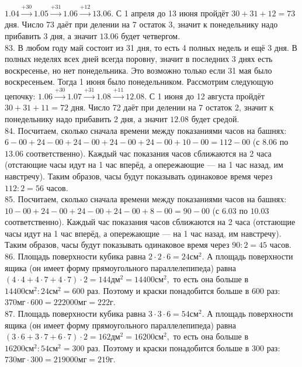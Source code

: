 $1.04\stackrel{+30}{\rightarrow}1.05\stackrel{+31}{\rightarrow}1.06\stackrel{+12}{\rightarrow}13.06.$ С 1 апреля до 13 июня пройдёт $30+31+12=73$ дня. Число 73 даёт при делении на 7 остаток 3, значит к понедельнику надо прибавить 3 дня, а значит $13.06$ будет четвергом.\\
83. В любом году май состоит из 31 дня, то есть 4 полных недель и ещё 3 дня. В полных неделях всех дней всегда поровну, значит в последних 3 днях есть воскресенье, но нет понедельника. Это возможно только если 31 мая было воскресеньем. Тогда 1 июня было понедельником. Рассмотрим следующую цепочку:
$1.06\stackrel{+30}{\rightarrow}1.07\stackrel{+31}{\rightarrow}1.08\stackrel{+11}{\rightarrow}12.08.$ С 1 июня до 12 августа пройдёт $30+31+11=72$ дня. Число 72 даёт при делении на 7 остаток 2, значит к понедельнику надо прибавить 2 дня, а значит $12.08$ будет средой.\\
84. Посчитаем, сколько сначала времени между показаниями часов на башнях: $6-00+24-00+24-00+24-00+24-00+10-00=112-00$ (с $8.06$ по $13.06$ соответственно). Каждый час показания часов сближаются на 2 часа (отстающие часы идут на 1 час вперёд, а опережающие --- на 1 час назад, им навстречу). Таким образов, часы будут показывать одинаковое время через $112:2=56$ часов.\\
85. Посчитаем, сколько сначала времени между показаниями часов на башнях: $10-00+24-00+24-00+24-00+8-00=90-00$ (с $6.03$ по $10.03$ соответственно). Каждый час показания часов сближаются на 2 часа (отстающие часы идут на 1 час вперёд, а опережающие --- на 1 час назад, им навстречу). Таким образов, часы будут показывать одинаковое время через $90:2=45$ часов.\\
86. Площадь поверхности кубика равна $2\cdot2\cdot6=24\text{см}^2.$ А площадь поверхности ящика (он имеет форму прямоугольного параллелепипеда) равна $(4\cdot4+4\cdot7+4\cdot7)\cdot2=144\text{дм}^2=14400\text{см}^2,$ то есть она больше в $14400\text{см}^2:24\text{см}^2=600$ раз. Поэтому и краски понадобится больше в 600 раз: $370\text{мг}\cdot600=222000\text{мг}=222$г.\\
87. Площадь поверхности кубика равна $3\cdot3\cdot6=54\text{см}^2.$ А площадь поверхности ящика (он имеет форму прямоугольного параллелепипеда) равна $(3\cdot6+3\cdot7+6\cdot7)\cdot2=162\text{дм}^2=16200\text{см}^2,$ то есть она больше в $16200\text{см}^2:54\text{см}^2=300$ раз. Поэтому и краски понадобится больше в 300 раз: $730\text{мг}\cdot300=219000\text{мг}=219$г.\\

